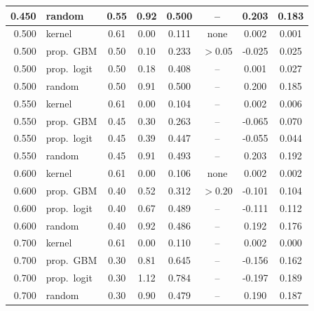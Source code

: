 \begin{tabular}{rlcccccc}
0.450 & random & 0.55 & 0.92 & 0.500 & -- & 0.203 & 0.183 \\
\midrule
0.500 & kernel & 0.61 & 0.00 & 0.111 & none & 0.002 & 0.001 \\
0.500 & prop.\ GBM & 0.50 & 0.10 & 0.233 & $>0.05$ & -0.025 & 0.025 \\
0.500 & prop.\ logit & 0.50 & 0.18 & 0.408 & -- & 0.001 & 0.027 \\
0.500 & random & 0.50 & 0.91 & 0.500 & -- & 0.200 & 0.185 \\
\midrule
0.550 & kernel & 0.61 & 0.00 & 0.104 & -- & 0.002 & 0.006 \\
0.550 & prop.\ GBM & 0.45 & 0.30 & 0.263 & -- & -0.065 & 0.070 \\
0.550 & prop.\ logit & 0.45 & 0.39 & 0.447 & -- & -0.055 & 0.044 \\
0.550 & random & 0.45 & 0.91 & 0.493 & -- & 0.203 & 0.192 \\
\midrule
0.600 & kernel & 0.61 & 0.00 & 0.106 & none & 0.002 & 0.002 \\
0.600 & prop.\ GBM & 0.40 & 0.52 & 0.312 & $>0.20$ & -0.101 & 0.104 \\
0.600 & prop.\ logit & 0.40 & 0.67 & 0.489 & -- & -0.111 & 0.112 \\
0.600 & random & 0.40 & 0.92 & 0.486 & -- & 0.192 & 0.176 \\
\midrule
0.700 & kernel & 0.61 & 0.00 & 0.110 & -- & 0.002 & 0.000 \\
0.700 & prop.\ GBM & 0.30 & 0.81 & 0.645 & -- & -0.156 & 0.162 \\
0.700 & prop.\ logit & 0.30 & 1.12 & 0.784 & -- & -0.197 & 0.189 \\
0.700 & random & 0.30 & 0.90 & 0.479 & -- & 0.190 & 0.187 \\
\bottomrule
\end{tabular}
